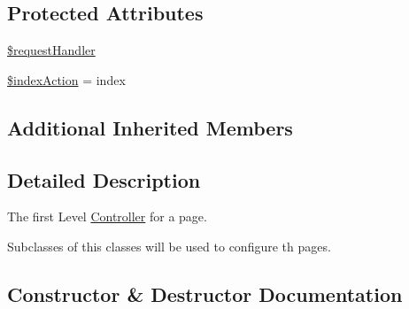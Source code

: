 \subsection*{Protected Attributes}
\begin{DoxyCompactItemize}
\item 
\hyperlink{classWEPPO_1_1Controller_1_1Controller_ab0ddc5efebeac13fc91736e9ba521486}{\$request\+Handler}
\item 
\hyperlink{classWEPPO_1_1Controller_1_1Controller_a9b3514daa7cd3165920c2b9bdeef53bf}{\$index\+Action} = \textquotesingle{}index\textquotesingle{}
\end{DoxyCompactItemize}
\subsection*{Additional Inherited Members}


\subsection{Detailed Description}
The first Level \hyperlink{classWEPPO_1_1Controller_1_1Controller}{Controller} for a page.

Subclasses of this classes will be used to configure th pages. 

\subsection{Constructor \& Destructor Documentation}
